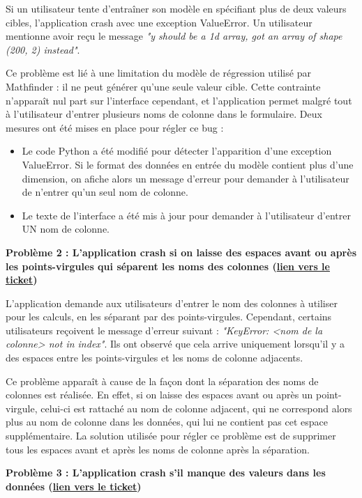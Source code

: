 \documentclass[french]{article}
\begin{document}
    Si un utilisateur tente d'entraîner son modèle en spécifiant plus de deux valeurs cibles, l'application crash avec une exception ValueError. Un utilisateur mentionne avoir reçu le message \textit{"y should be a 1d array, got an array of shape (200, 2) instead"}.

    Ce problème est lié à une limitation du modèle de régression utilisé par Mathfinder : il ne peut générer qu'une seule valeur cible. Cette contrainte n'apparaît nul part sur l'interface cependant, et l'application permet malgré tout à l'utilisateur d'entrer plusieurs noms de colonne dans le formulaire. Deux mesures ont été mises en place pour régler ce bug :
    \begin{itemize}
        \item Le code Python a été modifié pour détecter l'apparition d'une exception ValueError. Si le format des données en entrée du modèle contient plus d'une dimension, on afiche alors un message d'erreur pour demander à l'utilisateur de n'entrer qu'un seul nom de colonne.
        \item Le texte de l'interface a été mis à jour pour demander à l'utilisateur d'entrer UN nom de colonne.
    \end{itemize}

    \textbf{Problème 2 : L'application crash si on laisse des espaces avant ou après les points-virgules qui séparent les noms des colonnes (\href{https://github.com/vinpap/mathfinder/issues/3}{lien vers le ticket})}

    L'application demande aux utilisateurs d'entrer le nom des colonnes à utiliser pour les calculs, en les séparant par des points-virgules. Cependant, certains utilisateurs reçoivent le message d'erreur suivant : \textit{"KeyError: <nom de la colonne> not in index"}. Ils ont observé que cela arrive uniquement lorsqu'il y a des espaces entre les points-virgules et les noms de colonne adjacents.

    Ce problème apparaît à cause de la façon dont la séparation des noms de colonnes est réalisée. En effet, si on laisse des espaces avant ou après un point-virgule, celui-ci est rattaché au nom de colonne adjacent, qui ne correspond alors plus au nom de colonne dans les données, qui lui ne contient pas cet espace supplémentaire. La solution utilisée pour régler ce problème est de supprimer tous les espaces avant et après les noms de colonne après la séparation. 

    \textbf{Problème 3 : L'application crash s'il manque des valeurs dans les données (\href{https://github.com/vinpap/mathfinder/issues/4}{lien vers le ticket})}
\end{document}
